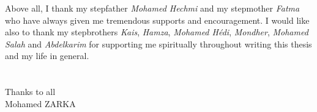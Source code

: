 \begin{remerciements}
Above all, I thank my stepfather \emph{Mohamed Hechmi} and my stepmother \emph{Fatma} who have always given me tremendous supports and encouragement. I would like also to thank my stepbrothers  \emph{Kais}, \emph{Hamza}, \emph{Mohamed Hédi}, \emph{Mondher}, \emph{Mohamed Salah} and \emph{Abdelkarim} for supporting me spiritually throughout writing this thesis and  my life in general.
\\
\\
\\

Thanks to all\\
Mohamed ZARKA
\end{remerciements}
